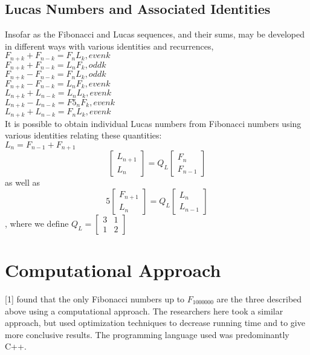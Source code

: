 \documentclass[11pt]{article}
\begin{document}
\subsection{Lucas Numbers and Associated Identities}
Insofar as the Fibonacci and Lucas sequences, and their sums, may be developed in different ways with various identities and recurrences, 
$F_{n+k} + F_{n-k} = F_{n}L_{k}, even k$\\
$F_{n+k} + F_{n-k} = L_{n}F_{k}, odd k$\\$F_{n+k} - F_{n-k} = F_{n}L_{k}, odd k$ \\ $F_{n+k} - F_{n-k} = L_{n}F_{k}, even k$ \\ $L_{n+k} + L_{n-k} = L_{n}L_{k}, even k$ \\ $L_{n+k} - L_{n-k} = F5_{n}F_{k}, even k$ \\ $L_{n+k} + L_{n-k} = F_{n}L_{k}, even k$\\ It is possible to obtain individual Lucas numbers from Fibonacci numbers using various identities relating these quantities:\\$L_{n} = F_{n-1} + F_{n+1}$ \\ 
\[
\begin{bmatrix}
L_{n+1} \\
L_{n}
\end{bmatrix} = Q_{L} \begin{bmatrix} F_{n} \\ F_{n-1}\end{bmatrix}
\] 
as well as \\
\[
5\begin{bmatrix}
F_{n+1} \\
L_{n}
\end{bmatrix} = Q_{L} \begin{bmatrix} L_{n} \\ L_{n-1}\end{bmatrix}
\] , where we define $Q_{L} = \begin{bmatrix} 3 & 1 \\ 1 & 2 \end{bmatrix}$

\section{Computational Approach}

[1] found that the only Fibonacci numbers up to $F_{1000000}$ are the three described above using a computational approach. The researchers here took a similar approach, but used optimization techniques to decrease running time and to give more conclusive results. The programming language used was predominantly C++.
\end{document}
